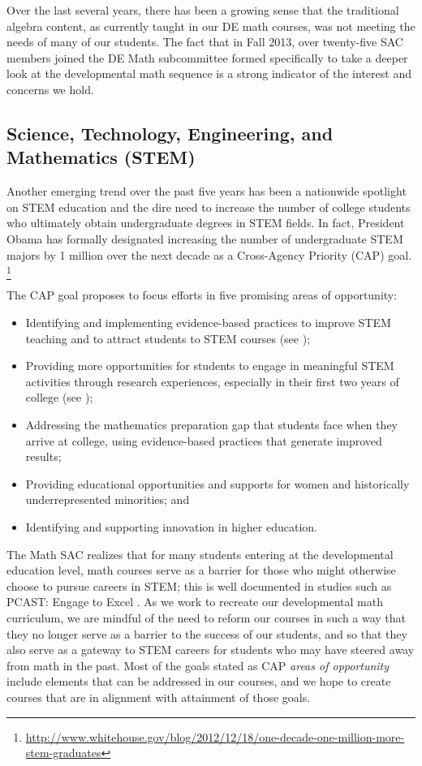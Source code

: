 Over the last several years, there has been a growing sense that the traditional
algebra content, as currently taught in our DE math courses, was not meeting the
needs of many of our students. The fact that in Fall 2013, over twenty-five SAC
members joined the DE Math subcommittee formed specifically to take a deeper
look at  the developmental math sequence is a strong indicator of the interest and
concerns we hold.

\subsection{Science, Technology, Engineering, and Mathematics (STEM)}
Another emerging trend over the past five years has been a nationwide spotlight
on STEM education and the dire need to increase the
number of college students who ultimately obtain undergraduate degrees in STEM fields. In
fact, President Obama has formally designated increasing the number of undergraduate STEM majors by 1 million over the next decade as a Cross-Agency Priority (CAP) goal. 
\footnote{\url{http://www.whitehouse.gov/blog/2012/12/18/one-decade-one-million-more-stem-graduates}}

The CAP goal proposes to focus efforts in five promising areas of opportunity:
\begin{itemize}
 \item Identifying and implementing evidence-based practices to improve STEM teaching
    and to attract students to STEM courses (see
    );
\item Providing more opportunities for students to engage in meaningful  STEM
activities through research experiences, especially in their first two years of
college (see
    ); 
\item Addressing the mathematics preparation gap that students face when they arrive
at college, using evidence-based practices that generate improved results;
\item Providing educational opportunities and supports for women and historically
underrepresented minorities; and 
\item Identifying and supporting innovation in higher
education.
\end{itemize}

The Math SAC realizes that for many students entering at the developmental
education level, math courses serve as a barrier for those who might otherwise
choose to pursue careers in STEM; this is well documented in studies such as
PCAST: Engage to Excel \cite{engagetoexcel}. As we work to recreate our developmental math curriculum, we are mindful of the need to reform our courses in such a way that they no longer serve as a barrier to the success of our students, and so that they also serve as a gateway to
STEM careers for students who may have steered away from math in the past.  Most
of the goals stated as CAP \emph{areas of opportunity} include elements that
can be addressed in our courses, and we hope to create courses that are in alignment with
attainment of those goals.

